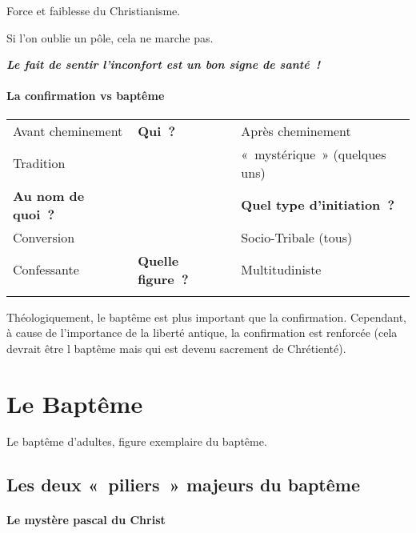 Force et faiblesse du Christianisme.

Si l'on oublie un pôle, cela ne marche pas.

\emph{\textbf{Le fait de sentir l'inconfort est un bon signe de
santé~!}}

\hypertarget{la-confirmation-vs-baptuxeame}{%
\paragraph{La confirmation vs
baptême}\label{la-confirmation-vs-baptuxeame}}


\begin{table}[h!]
    \centering
    \sidecaption{  }
 \footnotesize
\begin{tabular}{p{}p{}p{}}
\toprule
Avant cheminement & \textbf{Qui~?} & Après cheminement \\
Tradition & & «~mystérique~» (quelques uns) \\
\textbf{Au nom de quoi~?} & & \textbf{Quel type d'initiation~?} \\
Conversion & & Socio-Tribale (tous) \\
Confessante & \textbf{Quelle figure~?} & Multitudiniste \\
\\
\bottomrule
\end{tabular}
\label{tab:my_label}
\end{table}


Théologiquement, le baptême est plus important que la confirmation.
Cependant, à cause de l'importance de la liberté antique, la
confirmation est renforcée (cela devrait être l baptême mais qui est
devenu sacrement de Chrétienté).

\hypertarget{le-baptuxeame}{%
\section{Le Baptême}\label{le-baptuxeame}}

Le baptême d'adultes, figure exemplaire du baptême.

\hypertarget{les-deux-piliers-majeurs-du-baptuxeame}{%
\subsection{Les deux «~piliers~» majeurs du
baptême}\label{les-deux-piliers-majeurs-du-baptuxeame}}

\hypertarget{le-mystuxe8re-pascal-du-christ}{%
\paragraph{Le mystère pascal du
Christ}\label{le-mystuxe8re-pascal-du-christ}}

